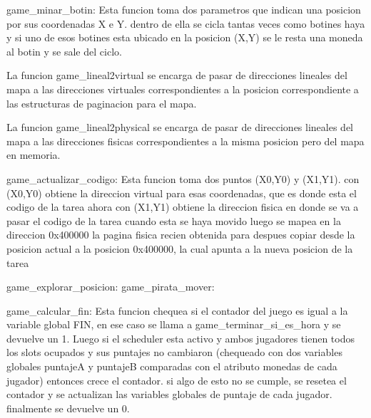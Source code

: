   game_minar_botin:
    Esta funcion toma dos parametros que indican una posicion por sus coordenadas X e Y.
    dentro de ella se cicla tantas veces como botines haya y si uno de esos botines esta ubicado en la
    posicion (X,Y) se le resta una moneda al botin y se sale del ciclo.

  La funcion game_lineal2virtual se encarga de pasar de direcciones lineales del mapa a las direcciones
  virtuales correspondientes a la posicion correspondiente a las estructuras de paginacion para el mapa.

  La funcion game_lineal2physical se encarga de pasar de direcciones lineales del mapa a las direcciones
  fisicas correspondientes a la misma posicion pero del mapa en memoria.

  game_actualizar_codigo:
    Esta funcion toma dos puntos (X0,Y0) y (X1,Y1).
    con (X0,Y0) obtiene la direccion virtual para esas coordenadas, que es donde esta el codigo de la tarea ahora
    con (X1,Y1) obtiene la direccion fisica en donde se va a pasar el codigo de la tarea cuando esta se haya movido
    luego se mapea en la direccion 0x400000 la pagina fisica recien obtenida
    para despues copiar desde la posicion actual a la posicion 0x400000, la cual apunta a la nueva posicion de la tarea

  game_explorar_posicion:
  game_pirata_mover:


  game_calcular_fin:
    Esta funcion chequea si el contador del juego es igual a la variable global FIN, en ese caso se llama a game_terminar_si_es_hora
    y se devuelve un 1.
    Luego si el scheduler esta activo y ambos jugadores tienen todos los slots ocupados y sus puntajes no cambiaron
    (chequeado con dos variables globales puntajeA y puntajeB comparadas con el atributo monedas de cada jugador)
    entonces crece el contador.
    si algo de esto no se cumple, se resetea el contador y se actualizan las variables globales de puntaje de cada jugador.
    finalmente se devuelve un 0.
